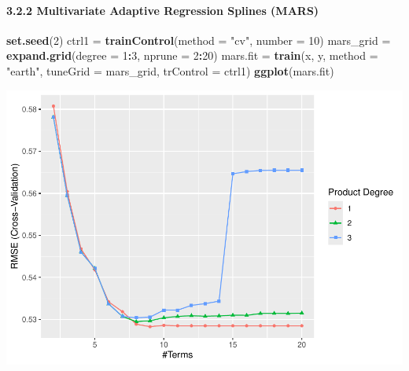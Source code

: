\documentclass[
]{article}
\newenvironment{Shaded}{\begin{snugshade}}{\end{snugshade}}
\newcommand{\AttributeTok}[1]{\textcolor[rgb]{0.13,0.29,0.53}{#1}}
\newcommand{\DecValTok}[1]{\textcolor[rgb]{0.00,0.00,0.81}{#1}}
\newcommand{\FunctionTok}[1]{\textcolor[rgb]{0.13,0.29,0.53}{\textbf{#1}}}
\newcommand{\NormalTok}[1]{#1}
\newcommand{\OtherTok}[1]{\textcolor[rgb]{0.56,0.35,0.01}{#1}}
\newcommand{\SpecialCharTok}[1]{\textcolor[rgb]{0.81,0.36,0.00}{\textbf{#1}}}
\newcommand{\StringTok}[1]{\textcolor[rgb]{0.31,0.60,0.02}{#1}}
\begin{document}
\paragraph{3.2.2 Multivariate Adaptive Regression Splines
(MARS)}\label{multivariate-adaptive-regression-splines-mars}

\begin{Shaded}
\begin{Highlighting}[]
\FunctionTok{set.seed}\NormalTok{(}\DecValTok{2}\NormalTok{)}
\NormalTok{ctrl1 }\OtherTok{=} \FunctionTok{trainControl}\NormalTok{(}\AttributeTok{method =} \StringTok{"cv"}\NormalTok{, }\AttributeTok{number =} \DecValTok{10}\NormalTok{)}
\NormalTok{mars\_grid }\OtherTok{=} \FunctionTok{expand.grid}\NormalTok{(}\AttributeTok{degree =} \DecValTok{1}\SpecialCharTok{:}\DecValTok{3}\NormalTok{, }\AttributeTok{nprune =} \DecValTok{2}\SpecialCharTok{:}\DecValTok{20}\NormalTok{)}
\NormalTok{mars.fit }\OtherTok{=} \FunctionTok{train}\NormalTok{(x, y, }\AttributeTok{method =} \StringTok{"earth"}\NormalTok{, }\AttributeTok{tuneGrid =}\NormalTok{ mars\_grid,}
\AttributeTok{trControl =}\NormalTok{ ctrl1)}
\FunctionTok{ggplot}\NormalTok{(mars.fit)}
\end{Highlighting}
\end{Shaded}

\includegraphics{p8106_midterm_project_files/figure-latex/unnamed-chunk-30-1.pdf}

\begin{Shaded}
\end{Shaded}
\end{document}
